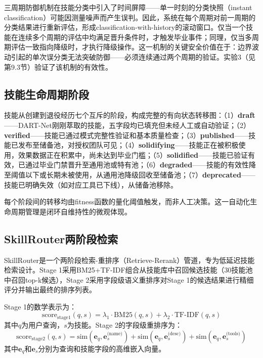 \documentclass[12pt,a4paper]{ctexart}
\begin{document}
三周期防御机制在技能分类中引入了时间屏障——单一时刻的分类快照（instant classification）可能因测量噪声而产生误判。因此，系统在每个周期对前一周期的分类结果进行重新评估，形成classification-with-history的滚动窗口。仅当一个技能在连续多个周期的评估中均满足晋升条件时，才触发毕业事件；同理，仅当多周期评估一致指向降级时，才执行降级操作。这一机制的关键安全价值在于：边界波动引起的单次误分类无法突破防御——必须连续通过两个周期的验证。实验3（见第9.3节）验证了该机制的有效性。

\subsection{技能生命周期阶段}

技能从创建到退役经历七个互斥的阶段，构成完整的有向状态转移图：（1）\textbf{draft}——DART-Net刚刚萃取的技能，五字段均已填充但未经人工或自动验证；（2）\textbf{verified}——技能已通过模式完整性验证和基本质量检查；（3）\textbf{published}——技能已发布至储备池，对授权团队可见；（4）\textbf{solidifying}——技能正在被积极使用，效果数据正在积累中，尚未达到毕业门槛；（5）\textbf{solidified}——技能已验证有效，已通过毕业门禁晋升至通用池或特有池；（6）\textbf{degraded}——技能的有效性降至阈值以下或长期未被使用，从通用池降级回收至储备池；（7）\textbf{deprecated}——技能已明确失效（如对应工具已下线），从储备池移除。

每个阶段间的转移均由fitness函数的量化阈值触发，而非人工决策。这一自动化生命周期管理是闭环自维持性的微观体现。

\subsection{SkillRouter两阶段检索}

SkillRouter是一个两阶段检索-重排序（Retrieve-Rerank）管道，专为低延迟技能检索设计。Stage 1采用BM25+TF-IDF组合从技能库中召回候选技能（30技能池中召回top-k候选），Stage 2采用字段级语义重排序对Stage 1的候选结果进行精细评分并输出最终的排序列表。

Stage 1的数学表示为：
\begin{equation}
\text{score}_{\text{stage1}}(q, s) = \lambda_1 \cdot \text{BM25}(q, s) + \lambda_2 \cdot \text{TF-IDF}(q, s)
\label{eq:stage1}
\end{equation}
其中$q$为用户查询，$s$为技能。Stage 2的字段级重排序为：
\begin{equation}
\text{score}_{\text{stage2}}(q, s) = \text{sim}(\mathbf{e}_q, \mathbf{e}_s^{\text{(name)}}) + \text{sim}(\mathbf{e}_q, \mathbf{e}_s^{\text{(desc)}}) + \text{sim}(\mathbf{e}_q, \mathbf{e}_s^{\text{(tools)}})
\label{eq:stage2}
\end{equation}
其中$\mathbf{e}_q$和$\mathbf{e}_s$分别为查询和技能字段的高维嵌入向量。
\end{document}
